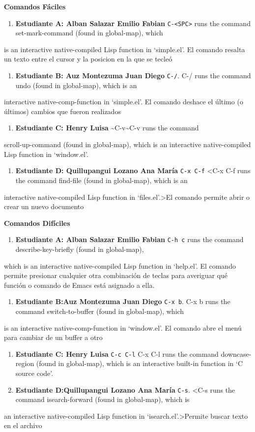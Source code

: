 \documentclass{article}
\begin{document}
\textbf{\textbf{Comandos Fáciles}}
\begin{enumerate}
\item \textbf{\textbf{Estudiante A: Alban Salazar Emilio Fabian}} \texttt{C-<SPC>} runs the command set-mark-command (found in global-map), which
\end{enumerate}
is an interactive native-compiled Lisp function in ‘simple.el’. El 
comando resalta un texto entre el cursor y la posicion en la que se tecleó
\begin{enumerate}
\item \textbf{\textbf{Estudiante B: Auz Montezuma Juan Diego}} \texttt{C-/}. C-/ runs the command undo (found in global-map), which is an
\end{enumerate}
interactive native-comp-function in ‘simple.el’. El comando deshace el
último (o últimos) cambios que fueron realizados
\begin{enumerate}
\item \textbf{\textbf{Estudiante C: Henry Luisa}} \textasciitilde{}C-v\textasciitilde{}C-v runs the command
\end{enumerate}
scroll-up-command (found in global-map), which is an interactive
native-compiled Lisp function in ‘window.el’.   
\begin{enumerate}
\item \textbf{\textbf{Estudiante D: Quillupangui Lozano Ana María}} \texttt{C-x C-f} <C-x C-f runs the command find-file (found in global-map), which is an
\end{enumerate}
interactive native-compiled Lisp function in ‘files.el’.>El comando
permite abrir o crear un nuevo documento

\textbf{\textbf{Comandos Difíciles}}
\begin{enumerate}
\item \textbf{\textbf{Estudiante A: Alban Salazar Emilio Fabian}} \texttt{C-h c} runs the command describe-key-briefly (found in global-map),
\end{enumerate}
which is an interactive native-compiled Lisp function in ‘help.el’. El
comando permite presionar cualquier otra combinación de teclas para averiguar qué función o comando de Emacs está asignado a ella.
\begin{enumerate}
\item \textbf{\textbf{Estudiante B:Auz Montezuma Juan Diego}} \texttt{C-x b}. C-x b runs the command switch-to-buffer (found in global-map), which
\end{enumerate}
is an interactive native-comp-function in ‘window.el’. El comando abre
el menú para cambiar de un buffer a otro
\begin{enumerate}
\item \textbf{\textbf{Estudiante C: Henry Luisa}} \texttt{C-c C-l} C-x C-l runs the command
downcase-region (found in global-map), which is an interactive
built-in function in ‘C source code’.
\item \textbf{\textbf{Estudiante D:Quillupangui Lozano Ana María}} \texttt{C-s}. <C-s runs the command isearch-forward (found in global-map), which is
\end{enumerate}
an interactive native-compiled Lisp function in ‘isearch.el’.>Permite
buscar texto en el archivo 
\end{document}
